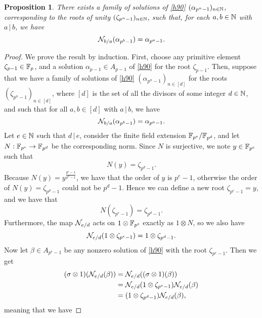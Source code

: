 \documentclass{sig-alternate}
\newtheorem{proposition}{Proposition}
\begin{document}
\begin{proposition}
  \label{prop:complete-alg}
  There exists a family of solutions of \eqref{h90}
  $(\alpha_{p^n-1})_{n\in\mathbb{N}}$, corresponding to the roots of unity
  $(\zeta_{p^n-1})_{n\in\mathbb{N}}$, such that, for each $a,b\in\mathbb{N}$
  with $a\,|\,b$, we have
  \[
    \mathcal{N}_{b/a}(\alpha_{p^b-1})=\alpha_{p^a-1}.
  \]
\end{proposition}
\begin{proof}


  We prove the result by induction. First, choose any primitive element
  $\zeta_{p-1}\in\mathbb{F}_p$, and a solution $\alpha_{p-1}\in
  A_{p-1}$ of \eqref{h90} for the root $\zeta_{p-1}$. Then, suppose that we have
  a family of solutions of \eqref{h90} $(\alpha_{p^n-1})_{n\in \left[ d
  \right]}$ for the roots
  $(\zeta_{p^n-1})_{n\in \left[ d \right]}$, where $\left[ d \right]$ is
  the set of all the divisors of some integer $d\in\mathbb{N}$, and such that for all $a,
  b\in \left[ d \right]$ with $a\,|\,b$, we have
  \[
    \mathcal{N}_{b/a}(\alpha_{p^b-1})=\alpha_{p^a-1}.
  \]
  Let $e\in\mathbb{N}$ such that $d\,|\,e$, consider the
  finite field extension $\mathbb{F}_{p^{e}}/\mathbb{F}_{p^{d}}$, and
  let $N:\mathbb{F}_{p^{e}}\to\mathbb{F}_{p^{d}}$ be the corresponding
  norm. Since $N$ is surjective, we note $y\in\mathbb{F}_{p^{e}}$ such
  that
  \[
    N(y) = \zeta_{p^{d}-1}.
  \]
  Because $N(y)=y^{\frac{p^{e}-1}{p^{d}-1}}$, we have that the order of
  $y$ is $p^{e}-1$, otherwise the order of $N(y)=\zeta_{p^{d}-1}$ could not
  be $p^{d}-1$. Hence we can define a new root $\zeta_{p^{e}-1}=y$, and we
  have that
  \[
    N(\zeta_{p^{e}-1})=\zeta_{p^{d}-1}.
  \]
  Furthermore, the map $\mathcal{N}_{e/d}$ acts on
  $1\otimes\mathbb{F}_{p^{e}}$ exactly as $1\otimes N$, so we also have
  \[
    \mathcal{N}_{e/d}(1\otimes\zeta_{p^{e}-1}) = 1\otimes\zeta_{p^{d}-1}.
  \]
Now let
$\beta\in A_{p^{e}-1}$ be any nonzero solution of \eqref{h90} with the root
$\zeta_{p^{e}-1}$.
Then we get
\begin{align*}
  (\sigma\otimes1)(\mathcal{N}_{e/d}(\beta)) &= \mathcal{N}_{e/d}((\sigma\otimes1)(\beta)) \\
  &= \mathcal{N}_{e/d}(1\otimes\zeta_{p^{e}-1}) \mathcal{N}_{e/d}(\beta) \\
  &= (1\otimes\zeta_{p^{d}-1})\mathcal{N}_{e/d}(\beta),
\end{align*}
meaning that we have

\end{proof}
\end{document}
